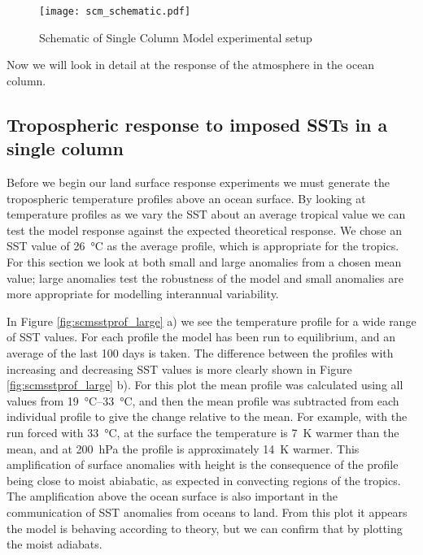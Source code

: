 \begin{figure}[ht]
\texttt{[image: scm\_schematic.pdf]}
\caption{Schematic of Single Column Model experimental setup}
\label{fig:scmschem}
\end{figure}

Now we will look in detail at the response of the atmosphere in the ocean 
column.

\subsection{Tropospheric response to imposed SSTs in a single column}
\label{trop_response_ocean}

Before we begin our land surface response experiments we must generate the 
tropospheric temperature profiles above an ocean surface. By looking at 
temperature profiles as we vary the SST about an average tropical value we can 
test the model response against the expected theoretical response. We chose an 
SST value of \SI{26}{\degreeCelsius} as the average profile, which is 
appropriate for the tropics. For this section we look at both small and large 
anomalies from a chosen mean value; large anomalies test the robustness of the 
model and small anomalies are more appropriate for modelling interannual 
variability.

In Figure \ref{fig:scmsstprof_large} a) we see the temperature profile for a 
wide range of SST values. For each profile the model has been run to 
equilibrium, and an average of the last 100 days is taken. The difference 
between the profiles with increasing and decreasing SST values is more clearly 
shown in Figure \ref{fig:scmsstprof_large} b). For this plot the mean profile 
was calculated using all values from \SIrange{19}{33}{\degreeCelsius}, and then 
the mean profile was subtracted from each individual profile to give the change 
relative to the mean. For example, with the run forced with 
\SI{33}{\degreeCelsius}, at the surface the temperature is \SI{7}{\kelvin} 
warmer than the mean, and at \SI{200}{\hecto\pascal} the profile is 
approximately \SI{14}{\kelvin} warmer. This amplification of surface anomalies 
with height is the consequence of the profile being close to moist abiabatic, as 
expected in convecting regions of the tropics. The amplification above the ocean 
surface is also important in the communication of SST anomalies from oceans to 
land. From this plot it appears the model is behaving according to theory, but 
we can confirm that by plotting the moist adiabats.

